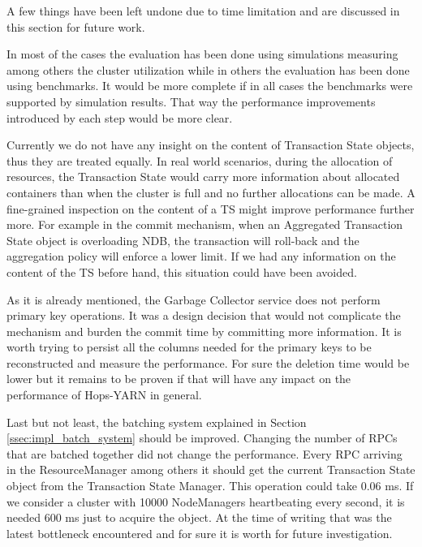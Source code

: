 A few things have been left undone due to time limitation and are
discussed in this section for future work.

In most of the cases the evaluation has been done using simulations
measuring among others the cluster utilization while in others the
evaluation has been done using benchmarks. It would be more complete
if in all cases the benchmarks were supported by simulation
results. That way the performance improvements introduced by each step
would be more clear.

Currently we do not have any insight on the content of Transaction
State objects, thus they are treated equally. In real world scenarios,
during the allocation of resources, the Transaction State would carry
more information about allocated containers than when the cluster is
full and no further allocations can be made. A fine-grained inspection
on the content of a TS might improve performance further more. For
example in the commit mechanism, when an Aggregated Transaction State
object is overloading NDB, the transaction will roll-back and the
aggregation policy will enforce a lower limit. If we had any
information on the content of the TS before hand, this situation could
have been avoided.

As it is already mentioned, the Garbage Collector service does not
perform primary key operations. It was a design decision that would
not complicate the mechanism and burden the commit time by committing
more information. It is worth trying to persist all the columns needed
for the primary keys to be reconstructed and measure the
performance. For sure the deletion time would be lower but it
remains to be proven if that will have any impact on the performance
of Hops-YARN in general.

Last but not least, the batching system explained in Section
\ref{ssec:impl_batch_system} should be improved. Changing the number
of RPCs that are batched together did not change the
performance. Every RPC arriving in the ResourceManager among others it
should get the current Transaction State object from the Transaction State
Manager. This operation could take $0.06$ ms. If we consider a cluster
with 10000 NodeManagers heartbeating every second, it is needed 600 ms
just to acquire the object. At the time of writing that was the latest
bottleneck encountered and for sure it is worth for future investigation.